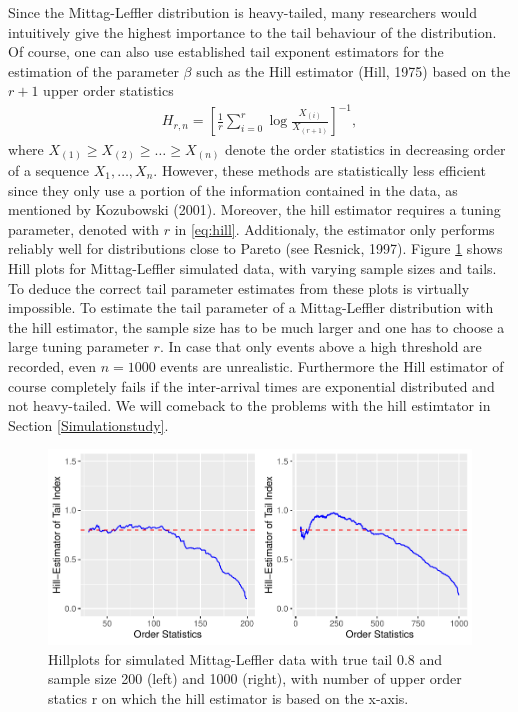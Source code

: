 \documentclass[]{elsarticle} %
\begin{document}
Since the Mittag-Leffler distribution is heavy-tailed, many researchers
would intuitively give the highest importance to the tail behaviour of
the distribution. Of course, one can also use established tail exponent
estimators for the estimation of the parameter \(\beta\) such as the
Hill estimator (Hill, 1975) based on the \(r+1\) upper order statistics
\begin{align}\label{eq:hill}
H_{r,n}=\left[ \frac{1}{r} \sum_{i=0}^{r} \log \frac{X_{(i)}}{X_{(r+1)}}\right]^{-1}, 
\end{align} where \(X_{(1)} \geq X_{(2)} \geq \ldots \geq X_{(n)}\)
denote the order statistics in decreasing order of a sequence
\(X_1,\ldots,X_n\). However, these methods are statistically less
efficient since they only use a portion of the information contained in
the data, as mentioned by Kozubowski (2001). Moreover, the hill
estimator requires a tuning parameter, denoted with \(r\) in
\eqref{eq:hill}. Additionaly, the estimator only performs reliably well
for distributions close to Pareto (see Resnick, 1997). Figure
\ref{fig:Hillplots} shows Hill plots for Mittag-Leffler simulated data,
with varying sample sizes and tails. To deduce the correct tail
parameter estimates from these plots is virtually impossible. To
estimate the tail parameter of a Mittag-Leffler distribution with the
hill estimator, the sample size has to be much larger and one has to
choose a large tuning parameter \(r\). In case that only events above a
high threshold are recorded, even \(n=1000\) events are unrealistic.
Furthermore the Hill estimator of course completely fails if the
inter-arrival times are exponential distributed and not heavy-tailed. We
will comeback to the problems with the hill estimtator in Section
\ref{Simulationstudy}.

\begin{figure}

{\centering \includegraphics[width=0.9\linewidth]{article_springer_files/figure-latex/Hillplots-1} 

}

\caption{\label{fig:Hillplots} Hillplots for simulated Mittag-Leffler data with true tail 0.8 and sample size 200 (left) and 1000 (right), with number of upper order statics r on which the hill estimator is based on the x-axis. }\label{fig:Hillplots}
\end{figure}
\end{document}
